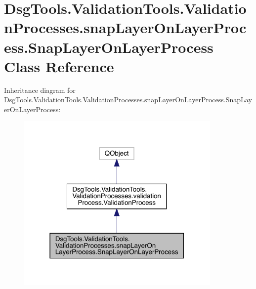 \hypertarget{class_dsg_tools_1_1_validation_tools_1_1_validation_processes_1_1snap_layer_on_layer_process_1_1_snap_layer_on_layer_process}{}\section{Dsg\+Tools.\+Validation\+Tools.\+Validation\+Processes.\+snap\+Layer\+On\+Layer\+Process.\+Snap\+Layer\+On\+Layer\+Process Class Reference}
\label{class_dsg_tools_1_1_validation_tools_1_1_validation_processes_1_1snap_layer_on_layer_process_1_1_snap_layer_on_layer_process}


Inheritance diagram for Dsg\+Tools.\+Validation\+Tools.\+Validation\+Processes.\+snap\+Layer\+On\+Layer\+Process.\+Snap\+Layer\+On\+Layer\+Process\+:
\nopagebreak
\begin{figure}[H]
\begin{center}
\leavevmode
\includegraphics[width=283pt]{class_dsg_tools_1_1_validation_tools_1_1_validation_processes_1_1snap_layer_on_layer_process_1_1fd2d647d3430f8d0a60b7054fac90db0}
\end{center}
\end{figure}


